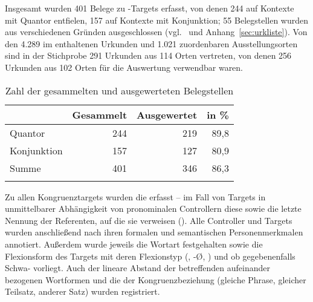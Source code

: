\label{phsec:caohiatus}

Insgesamt wurden 401 Belege zu -Targets erfasst, von
denen 244 auf Kontexte mit Quantor entfielen, 157 auf Kontexte mit Konjunktion;
55 Belegstellen wurden aus verschiedenen Gründen ausgeschlossen
(vgl.~ und Anhang~\ref{sec:urkliste}). Von den 4.289 im
\CAO{} enthaltenen Urkunden und 1.021 zuordenbaren
Ausstellungsorten sind in der Stichprobe 291 Urkunden aus 114 Orten
vertreten, von denen 256 Urkunden aus 102 Orten
für die Auswertung verwendbar waren.

\begin{table}
\centering
\caption{Zahl der gesammelten und ausgewerteten Belegstellen}
\begin{tabular}{l r r r}
\lsptoprule

%
	& Gesammelt
	& Ausgewertet
	& in \%
	\\

\midrule


Quantor
	& 244 %
	& 219 %
	& 89,8 %
	\\

Konjunktion
	& 157 %
	& 127 %
	& 80,9 %
	\\

\midrule

Summe
	& 401 %
	& 346 %
	& 86,3 %
	\\

\lspbottomrule
\end{tabular}
\label{tab:ausgewcao}
\end{table}

Zu allen Kongruenztargets wurden die  erfasst -- im
Fall von Targets in unmittelbarer Abhängigkeit von pronominalen Controllern
diese sowie die letzte Nennung der Referenten, auf die sie
verweisen (). Alle Controller und Targets
wurden anschließend nach ihren formalen und
semantischen Personenmerkmalen
annotiert. Außerdem wurde jeweils die Wortart festgehalten sowie die
Flexionsform des Targets mit deren Flexionstyp (, -Ø,
) und ob gegebenenfalls Schwa- vorliegt. Auch der
lineare Abstand der betreffenden aufeinander bezogenen
Wortformen und die  der Kongruenzbeziehung
(gleiche Phrase, gleicher Teilsatz, anderer Satz) wurden registriert.

